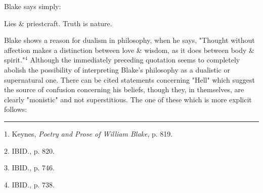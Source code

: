 \hspace*{5mm}Blake says simply:\par
\begin{center}
	\parbox{0.8\textwidth}{
		\centering
		\hspace*{5mm}Lies \& priestcraft. Truth is nature.\par
	}%
\end{center}
\hspace*{5mm}Blake shows a reason for dualism in philosophy, when he says, "Thought without affection makes a distinction
between love \& wisdom, as it does between body \& spirit."$^{4}$ Although
the immediately preceding quotation seems to completely abolish the possibility of interpreting
Blake's philosophy as a dualistic or supernatural one. There can be cited statements
concerning "Hell" which suggest the source of confusion concerning his beliefs,
though they, in themselves, are clearly "monistic" and not superstitious. The one of these which
is more explicit follows:\par
\vspace*{\fill}
\noindent\rule{0.25\textwidth}{0.4pt}\par
1. Keynes, \textit{Poetry and Prose of William Blake}, p. 819.\par
2. IBID., p. 820.\par
3. IBID., p. 746.\par
4. IBID., p. 738.\par

\newpage

